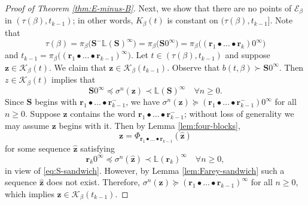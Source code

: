 \documentclass[11pt]{amsart}
\theoremstyle{definition}
\theoremstyle{remark}
\numberwithin{equation}{section}
\renewcommand{\L}{\ensuremath{\mathbb{L}}}
\newcommand{\EE}{\mathscr{E}}
\newcommand{\cs}{ {\mathbf{S}}}
\renewcommand{\r}{ {\mathbf{r}}}
\newcommand{\z}{\mathbf{z}}
\newcommand{\f}{\infty}
\newcommand{\lle}{\preccurlyeq}
\newcommand{\lge}{\succcurlyeq}
\begin{document}
\begin{proof}[Proof of Theorem \ref{thm:E-minus-B}]
Next, we show that there are no points of $\EE_\beta$ in $(\tau(\beta),t_{k-1})$; in other words, $K_\beta(t)$ is constant on $(\tau(\beta),t_{k-1}]$. Note that
\[
\tau(\beta)=\pi_\beta\big(\cs^-\L(\cs)^\f\big)=\pi_\beta\big(\cs 0^\f\big)=\pi_\beta\big((\r_1\bullet\dots\bullet \r_k)0^\f\big)
\]
and $t_{k-1}=\pi_\beta\big((\r_1\bullet\dots \bullet \r_{k-1})^\f\big)$. Let $t\in(\tau(\beta),t_{k-1})$ and suppose $\z\in\mathcal{K}_\beta(t)$. We claim that $\z\in\mathcal{K}_\beta(t_{k-1})$. Observe that {$b(t,\beta)\succ \cs 0^\f$. Then $z\in\mathcal K_\beta(t)$ implies that }
\begin{equation} \label{eq:S-sandwich}
\cs0^\f\lle \sigma^n(\z)\prec \L(\cs)^\f \quad\forall n\geq 0.
\end{equation}
Since $\cs$ begins with $\r_1\bullet \dots\bullet\r_{k-1}^-$, we have $\sigma^n(\z)\lge (\r_1\bullet \dots\bullet\r_{k-1}^-)0^\f$ for all $n\geq 0$. Suppose $\z$ contains the word $\r_1\bullet \dots\bullet\r_{k-1}^-$; without loss of generality we may assume $\z$ begins with it. Then by Lemma \ref{lem:four-blocks},
\[
\z=\Phi_{\r_1\bullet\dots\bullet \r_{k-1}}(\hat{\z})
\]
for some sequence $\hat{\z}$ satisfying
\[
\r_k0^\f\lle \sigma^n(\hat{\z})\prec \L(\r_k)^\f \quad\forall n\geq 0,
\]
in view of \eqref{eq:S-sandwich}. However, by Lemma \ref{lem:Farey-sandwich} such a sequence $\hat{\z}$ does not exist. Therefore, $\sigma^n(\z)\lge (\r_1\bullet \dots\bullet\r_{k-1})^\f$ for all $n\geq 0$, which implies $\z\in \mathcal{K}_\beta(t_{k-1})$.


\end{proof}
\end{document}
